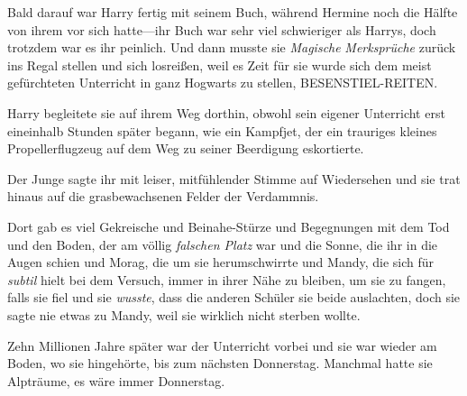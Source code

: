 Bald darauf war Harry fertig mit seinem Buch, während Hermine noch die Hälfte von ihrem vor sich hatte—ihr Buch war sehr viel schwieriger als Harrys, doch trotzdem war es ihr peinlich. Und dann musste sie \emph{Magische} \emph{Merksprüche} zurück ins Regal stellen und sich losreißen, weil es Zeit für sie wurde sich dem meist gefürchteten Unterricht in ganz Hogwarts zu stellen, BESENSTIEL-REITEN.

Harry begleitete sie auf ihrem Weg dorthin, obwohl sein eigener Unterricht erst eineinhalb Stunden später begann, wie ein Kampfjet, der ein trauriges kleines Propellerflugzeug auf dem Weg zu seiner Beerdigung eskortierte.

Der Junge sagte ihr mit leiser, mitfühlender Stimme auf Wiedersehen und sie trat hinaus auf die grasbewachsenen Felder der Verdammnis.

Dort gab es viel Gekreische und Beinahe-Stürze und Begegnungen mit dem Tod und den Boden, der am völlig \emph{falschen Platz} war und die Sonne, die ihr in die Augen schien und Morag, die um sie herumschwirrte und Mandy, die sich für \emph{subtil} hielt bei dem Versuch, immer in ihrer Nähe zu bleiben, um sie zu fangen, falls sie fiel und sie \emph{wusste}, dass die anderen Schüler sie beide auslachten, doch sie sagte nie etwas zu Mandy, weil sie wirklich nicht sterben wollte.

Zehn Millionen Jahre später war der Unterricht vorbei und sie war wieder am Boden, wo sie hingehörte, bis zum nächsten Donnerstag. Manchmal hatte sie Alpträume, es wäre immer Donnerstag.

